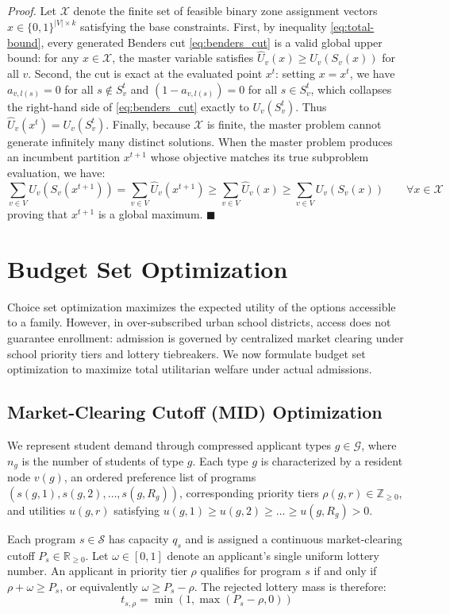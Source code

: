 \documentclass{article}
\begin{document}
\textit{Proof.} Let $\mathcal{X}$ denote the finite set of feasible binary zone assignment vectors $x \in \{0, 1\}^{|V| \times k}$ satisfying the base constraints. 
First, by inequality \eqref{eq:total-bound}, every generated Benders cut \eqref{eq:benders_cut} is a valid global upper bound: for any $x \in \mathcal{X}$, the master variable satisfies $\hat{U}_v(x) \geq U_v(S_v(x))$ for all $v$.
Second, the cut is exact at the evaluated point $x^t$: setting $x = x^t$, we have $a_{v, l(s)} = 0$ for all $s \notin S_v^t$ and $(1 - a_{v, l(s)}) = 0$ for all $s \in S_v^t$, which collapses the right-hand side of \eqref{eq:benders_cut} exactly to $U_v(S_v^t)$. Thus $\hat{U}_v(x^t) = U_v(S_v^t)$.
Finally, because $\mathcal{X}$ is finite, the master problem cannot generate infinitely many distinct solutions. When the master problem produces an incumbent partition $x^{t+1}$ whose objective matches its true subproblem evaluation, we have: 
$$\sum_{v \in V} U_v(S_v(x^{t+1})) = \sum_{v \in V} \hat{U}_v(x^{t+1}) \geq \sum_{v \in V} \hat{U}_v(x) \geq \sum_{v \in V} U_v(S_v(x)) \qquad \forall x \in \mathcal{X}$$
proving that $x^{t+1}$ is a global maximum. $\blacksquare$

\section{Budget Set Optimization}
Choice set optimization maximizes the expected utility of the options accessible to a family. However, in over-subscribed urban school districts, access does not guarantee enrollment: admission is governed by centralized market clearing under school priority tiers and lottery tiebreakers. We now formulate budget set optimization to maximize total utilitarian welfare under actual admissions.

\subsection{Market-Clearing Cutoff (MID) Optimization}
We represent student demand through compressed applicant types $g \in \mathcal{G}$, where $n_g$ is the number of students of type $g$. Each type $g$ is characterized by a resident node $v(g)$, an ordered preference list of programs $(s(g,1), s(g,2), \dots, s(g,R_g))$, corresponding priority tiers $\rho(g,r) \in \mathbb{Z}_{\ge 0}$, and utilities $u(g,r)$ satisfying $u(g,1) \geq u(g,2) \geq \dots \geq u(g,R_g) > 0$.

Each program $s \in \mathcal{S}$ has capacity $q_s$ and is assigned a continuous market-clearing cutoff $P_s \in \mathbb{R}_{\geq 0}$. Let $\omega \in [0, 1]$ denote an applicant's single uniform lottery number. An applicant in priority tier $\rho$ qualifies for program $s$ if and only if $\rho + \omega \geq P_s$, or equivalently $\omega \geq P_s - \rho$. The rejected lottery mass is therefore:
\begin{equation}
t_{s, \rho} = \min\left(1, \max(P_s - \rho, 0)\right)
\end{equation}
\end{document}
